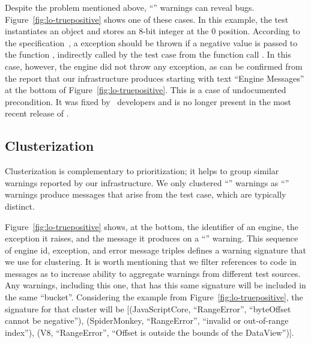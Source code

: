 \documentclass[sigconf,review, anonymous]{acmart}
\begin{document}
Despite the problem mentioned above, ``\lo'' warnings can reveal bugs.
Figure~\ref{fig:lo-truepositive} shows one of these cases. In this
example, the test instantiates an  object and
stores an 8-bit integer at the 0 position. According to the
specification~\cite{ecmas262-getviewvalue}, a 
exception should be thrown if a negative value is passed to the
function , indirectly called by the test case from the
function call . In this case, however, the \chakra{}
engine did not throw any exception, as can be confirmed from the
report that our infrastructure produces starting with text ``Engine
Messages'' at the bottom of Figure~\ref{fig:lo-truepositive}. This is
a case of undocumented precondition. It was fixed by
\chakra\ developers and is no longer present in the most recent
release of \chakra.

\subsection{Clusterization}
\label{sec:clusterization}


Clusterization is complementary to prioritization; it helps to group
similar warnings reported by our infrastructure. We only clustered
``\lo'' warnings as ``\hi'' warnings produce messages that arise from
the test case, which are typically distinct.

Figure~\ref{fig:lo-truepositive} shows, at the bottom, the identifier
of an engine, the exception it raises, and the message it produces on
a ``\lo'' warning.  This sequence of engine id, exception, and error
message triples defines a warning signature that we use for
clustering. It is worth mentioning that we filter references to code
in messages as to increase ability to aggregate warnings from
different test sources. Any warnings, including this one, that has
this same signature will be included in the same
``bucket''. Considering the example from
Figure~\ref{fig:lo-truepositive}, the signature for that cluster will
be [(JavaScriptCore, ``RangeError'', ``byteOffset cannot be
  negative''), (SpiderMonkey, ``RangeError'', ``invalid or
  out-of-range index''), (V8, ``RangeError'', ``Offset is outside the
  bounds of the DataView'')]. 
\end{document}
